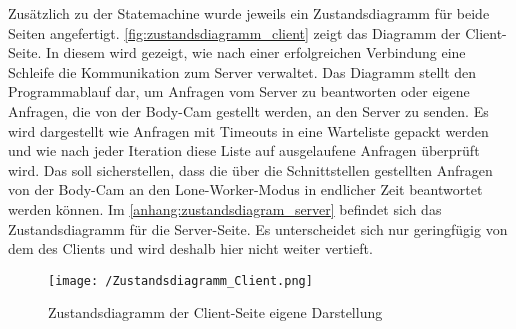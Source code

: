 \documentclass[thesis.tex]{subfiles}
\begin{document}
Zusätzlich zu der Statemachine wurde jeweils ein Zustandsdiagramm für beide Seiten angefertigt.
\autoref{fig:zustandsdiagramm_client} zeigt das Diagramm der Client-Seite.
In diesem wird gezeigt, wie nach einer erfolgreichen Verbindung eine Schleife die Kommunikation zum Server verwaltet.
Das Diagramm stellt den Programmablauf dar, um Anfragen vom Server zu beantworten oder eigene Anfragen, die von der Body-Cam gestellt werden, an den Server zu senden.
Es wird dargestellt wie Anfragen mit Timeouts in eine Warteliste gepackt werden und wie nach jeder Iteration diese Liste auf ausgelaufene Anfragen überprüft wird.
Das soll sicherstellen, dass die über die Schnittstellen gestellten Anfragen von der Body-Cam an den Lone-Worker-Modus in endlicher Zeit beantwortet werden können.
Im \autoref{anhang:zustandsdiagram_server} befindet sich das Zustandsdiagramm für die Server-Seite.
Es unterscheidet sich nur geringfügig von dem des Clients und wird deshalb hier nicht weiter vertieft.

\begin{figure}[h]
    \centering
    \texttt{[image: /Zustandsdiagramm\_Client.png]}
    \caption[Zustandsdiagramm der Client-Seite]{Zustandsdiagramm der Client-Seite \lbrack eigene Darstellung\rbrack}
    \label{fig:zustandsdiagramm_client}
\end{figure}

\subfilebib %
\end{document}
